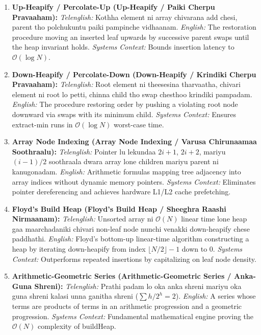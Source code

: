 \documentclass[10pt,twocolumn,letterpaper]{article}
\begin{document}
\begin{enumerate}
    \item \textbf{Up-Heapify / Percolate-Up (Up-Heapify / Paiki Cherpu Pravaaham):}
    \textit{Telenglish:} Kothha element ni array chivarana add chesi, parent tho polchukuntu paiki pampinche vidhaanam.
    \textit{English:} The restoration procedure moving an inserted leaf upwards by successive parent swaps until the heap invariant holds.
    \textit{Systems Context:} Bounds insertion latency to $\mathcal{O}(\log N)$.

    \item \textbf{Down-Heapify / Percolate-Down (Down-Heapify / Krindiki Cherpu Pravaaham):}
    \textit{Telenglish:} Root element ni theesesina tharvaatha, chivari element ni root lo petti, chinna child tho swap chesthoo krindiki pampadam.
    \textit{English:} The procedure restoring order by pushing a violating root node downward via swaps with its minimum child.
    \textit{Systems Context:} Ensures extract-min runs in $\mathcal{O}(\log N)$ worst-case time.

    \item \textbf{Array Node Indexing (Array Node Indexing / Varusa Chirunaamaa Soothraalu):}
    \textit{Telenglish:} Pointer lu lekundaa $2i+1$, $2i+2$, mariyu $(i-1)/2$ soothraala dwara array lone children mariyu parent ni kanugonadam.
    \textit{English:} Arithmetic formulas mapping tree adjacency into array indices without dynamic memory pointers.
    \textit{Systems Context:} Eliminates pointer dereferencing and achieves hardware L1/L2 cache prefetching.

    \item \textbf{Floyd's Build Heap (Floyd's Build Heap / Sheeghra Raashi Nirmaanam):}
    \textit{Telenglish:} Unsorted array ni $\mathcal{O}(N)$ linear time lone heap gaa maarchadaniki chivari non-leaf node nunchi venakki down-heapify chese paddhathi.
    \textit{English:} Floyd's bottom-up linear-time algorithm constructing a heap by iterating down-heapify from index $\lfloor N/2 \rfloor - 1$ down to 0.
    \textit{Systems Context:} Outperforms repeated insertions by capitalizing on leaf node density.

    \item \textbf{Arithmetic-Geometric Series (Arithmetic-Geometric Series / Anka-Guna Shreni):}
    \textit{Telenglish:} Prathi padam lo oka anka shreni mariyu oka guna shreni kalasi unna ganitha shreni ($\sum h / 2^h = 2$).
    \textit{English:} A series whose terms are products of terms in an arithmetic progression and a geometric progression.
    \textit{Systems Context:} Fundamental mathematical engine proving the $\mathcal{O}(N)$ complexity of buildHeap.


\end{enumerate}
\end{document}
